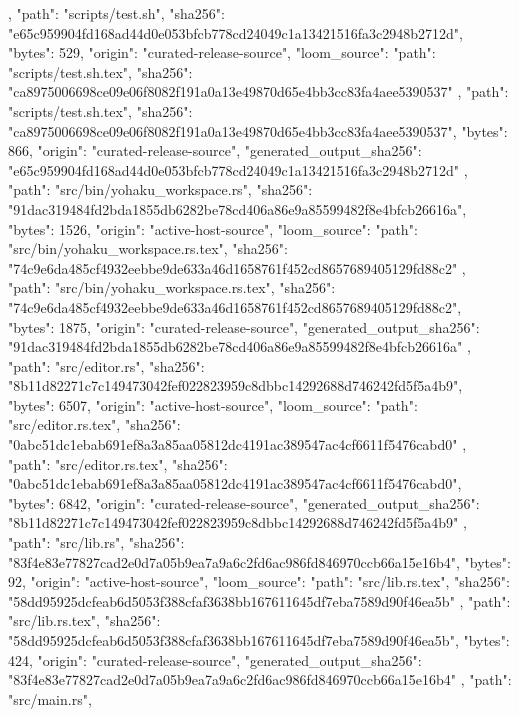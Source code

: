 {{    },
    {
      "path": "scripts/test.sh",
      "sha256": "e65c959904fd168ad44d0e053bfcb778cd24049c1a13421516fa3c2948b2712d",
      "bytes": 529,
      "origin": "curated-release-source",
      "loom_source": {
        "path": "scripts/test.sh.tex",
        "sha256": "ca8975006698ce09e06f8082f191a0a13e49870d65e4bb3cc83fa4aee5390537"
      }
    },
    {
      "path": "scripts/test.sh.tex",
      "sha256": "ca8975006698ce09e06f8082f191a0a13e49870d65e4bb3cc83fa4aee5390537",
      "bytes": 866,
      "origin": "curated-release-source",
      "generated_output_sha256": "e65c959904fd168ad44d0e053bfcb778cd24049c1a13421516fa3c2948b2712d"
    },
    {
      "path": "src/bin/yohaku_workspace.rs",
      "sha256": "91dac319484fd2bda1855db6282be78cd406a86e9a85599482f8e4bfcb26616a",
      "bytes": 1526,
      "origin": "active-host-source",
      "loom_source": {
        "path": "src/bin/yohaku_workspace.rs.tex",
        "sha256": "74c9e6da485cf4932eebbe9de633a46d1658761f452cd8657689405129fd88c2"
      }
    },
    {
      "path": "src/bin/yohaku_workspace.rs.tex",
      "sha256": "74c9e6da485cf4932eebbe9de633a46d1658761f452cd8657689405129fd88c2",
      "bytes": 1875,
      "origin": "curated-release-source",
      "generated_output_sha256": "91dac319484fd2bda1855db6282be78cd406a86e9a85599482f8e4bfcb26616a"
    },
    {
      "path": "src/editor.rs",
      "sha256": "8b11d82271c7c149473042fef022823959c8dbbc14292688d746242fd5f5a4b9",
      "bytes": 6507,
      "origin": "active-host-source",
      "loom_source": {
        "path": "src/editor.rs.tex",
        "sha256": "0abc51dc1ebab691ef8a3a85aa05812dc4191ac389547ac4cf6611f5476cabd0"
      }
    },
    {
      "path": "src/editor.rs.tex",
      "sha256": "0abc51dc1ebab691ef8a3a85aa05812dc4191ac389547ac4cf6611f5476cabd0",
      "bytes": 6842,
      "origin": "curated-release-source",
      "generated_output_sha256": "8b11d82271c7c149473042fef022823959c8dbbc14292688d746242fd5f5a4b9"
    },
    {
      "path": "src/lib.rs",
      "sha256": "83f4e83e77827cad2e0d7a05b9ea7a9a6c2fd6ac986fd846970ccb66a15e16b4",
      "bytes": 92,
      "origin": "active-host-source",
      "loom_source": {
        "path": "src/lib.rs.tex",
        "sha256": "58dd95925dcfeab6d5053f388cfaf3638bb167611645df7eba7589d90f46ea5b"
      }
    },
    {
      "path": "src/lib.rs.tex",
      "sha256": "58dd95925dcfeab6d5053f388cfaf3638bb167611645df7eba7589d90f46ea5b",
      "bytes": 424,
      "origin": "curated-release-source",
      "generated_output_sha256": "83f4e83e77827cad2e0d7a05b9ea7a9a6c2fd6ac986fd846970ccb66a15e16b4"
    },
    {
      "path": "src/main.rs",
}}
